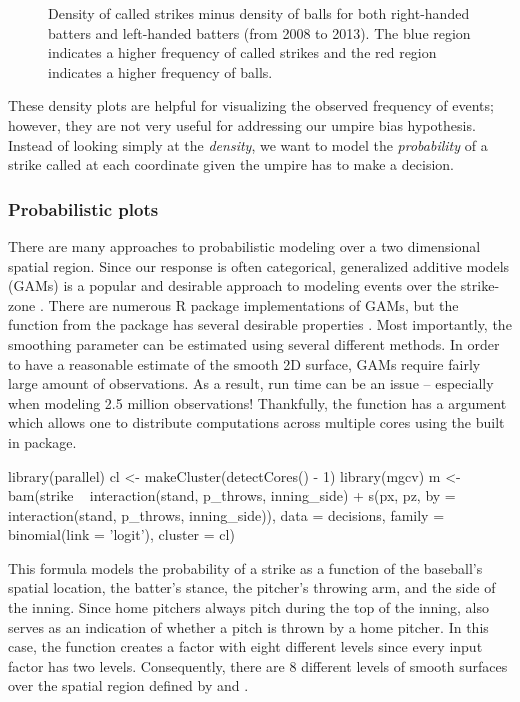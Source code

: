 \begin{article}
\begin{figure}[h]
\caption{\label{fig:strikesVSballs} Density of called strikes minus density
of balls for both right-handed batters and left-handed batters (from
2008 to 2013). The blue region indicates a higher frequency of called
strikes and the red region indicates a higher frequency of balls.}
\end{figure}


These density plots are helpful for visualizing the observed frequency
of events; however, they are not very useful for addressing our umpire
bias hypothesis. Instead of looking simply at the \emph{density},
we want to model the \emph{probability} of a strike called at each
coordinate given the umpire has to make a decision. 


\subsubsection{Probabilistic plots}

There are many approaches to probabilistic modeling over a two dimensional
spatial region. Since our response is often categorical, generalized
additive models (GAMs) is a popular and desirable approach to modeling
events over the strike-zone \citep{loess}. There are numerous R package
implementations of GAMs, but the  function from the 
package has several desirable properties \citep{mgcv}. Most importantly,
the smoothing parameter can be estimated using several different methods.
In order to have a reasonable estimate of the smooth 2D surface, GAMs
require fairly large amount of observations. As a result, run time
can be an issue -- especially when modeling 2.5 million observations!
Thankfully, the  function has a  argument
which allows one to distribute computations across multiple cores
using the built in  package.
%
\begin{Schunk}
\begin{Sinput}
library(parallel) 
cl <- makeCluster(detectCores() - 1)
library(mgcv) 
m <- bam(strike ~ interaction(stand, p_throws, inning_side) +                
  s(px, pz, by = interaction(stand, p_throws, inning_side)),              
  data = decisions, family = binomial(link = 'logit'), cluster = cl)
\end{Sinput}
\end{Schunk}
%
This formula models the probability of a strike as a function of the
baseball's spatial location, the batter's stance, the pitcher's throwing
arm, and the side of the inning. Since home pitchers always pitch
during the top of the inning,  also serves as
an indication of whether a pitch is thrown by a home pitcher. In this
case, the  function creates a factor with eight
different levels since every input factor has two levels. Consequently,
there are 8 different levels of smooth surfaces over the spatial region
defined by  and .


\end{article}
